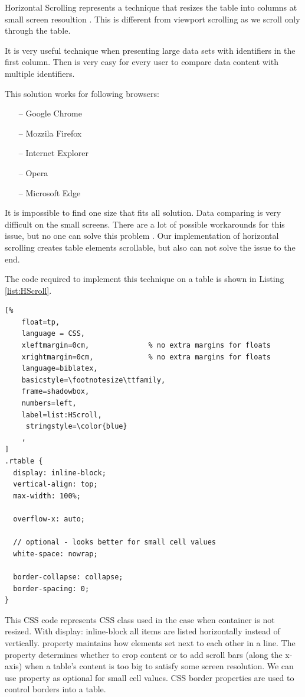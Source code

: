 Horizontal Scrolling represents a technique that resizes the table
into columns at small screen resoultion \parencite{HS_1}. 
This is different from viewport scrolling as we scroll only through 
the table.

It is very useful technique when presenting large data
 sets with identifiers in the first column. Then is very easy for 
 every user to compare data content with 
 multiple identifiers\parencite{HS}.

This solution works for following browsers:
\begin{itemize}
    \item[--] Google Chrome
    \item[--] Mozzila Firefox
    \item[--] Internet Explorer
    \item[--] Opera
    \item[--] Microsoft Edge
\end{itemize}

It is impossible to find one size that fits all solution. Data 
comparing is very difficult on the small screens.
There are a lot of possible workarounds for this issue, but no 
one can solve this problem \parencite{HS_1}.
Our implementation of horizontal scrolling creates table elements
 scrollable, but also can not solve the issue 
 to the end\parencite{HS_1}.

The code required to implement this technique 
on a table is shown in Listing \ref{list:HScroll}.

\begin{lstlisting}[%
    float=tp,
    language = CSS,
    xleftmargin=0cm,              % no extra margins for floats
    xrightmargin=0cm,             % no extra margins for floats
    language=biblatex,
    basicstyle=\footnotesize\ttfamily,
    frame=shadowbox,
    numbers=left,
    label=list:HScroll,
     stringstyle=\color{blue}
    ,
]
.rtable {
  display: inline-block;
  vertical-align: top;
  max-width: 100%;

  overflow-x: auto;

  // optional - looks better for small cell values
  white-space: nowrap;

  border-collapse: collapse;
  border-spacing: 0;
}

\end{lstlisting}

This CSS code represents CSS class  used in the case
when container is not resized. With display: inline-block all items
are listed horizontally instead of vertically.  
property maintains how elements set next to each other in a line. The 
 property determines whether to crop content or
to add scroll bars (along the x-axis) when a table's content is too
big to satisfy some screen resolution. We can use  
property as optional for small cell values. CSS border properties are used 
to control borders into a table\parencite{HS_1}.

